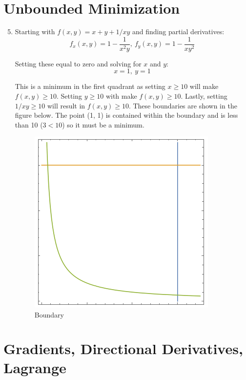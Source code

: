 \documentclass{article}
\begin{document}
\section{Unbounded Minimization}
\begin{enumerate}[1.]
  \setcounter{enumi}{4}
\item Starting with $f(x, y) = x + y + 1/xy$ and finding partial derivatives:
  $$ f_{x}(x, y) = 1 - \frac{ 1 }{ x^{2} y },\ f_{y}(x, y) = 1 - \frac{ 1 }{ x
  y^{2} } $$

  Setting these equal to zero and solving for $x$ and $y$:
  $$ x = 1,\ y = 1 $$

  This is a minimum in the first quadrant as setting $x \geq 10$ will make
  $f(x, y) \geq 10$. Setting $y \geq 10$ with make $f(x, y) \geq 10$. Lastly,
  setting $1/xy \geq 10$ will result in $f(x,y) \geq 10$. These boundaries are
  shown in the figure below. The point (1, 1) is contained within the boundary
  and is less than 10 ($3 < 10$) so it must be a minimum.

  \begin{figure}[H]
    \centering
    \includegraphics[scale=0.70]{"Boundary"}
    \caption{Boundary}
  \end{figure}
\end{enumerate}

\section{Gradients, Directional Derivatives, Lagrange}
\end{document}
